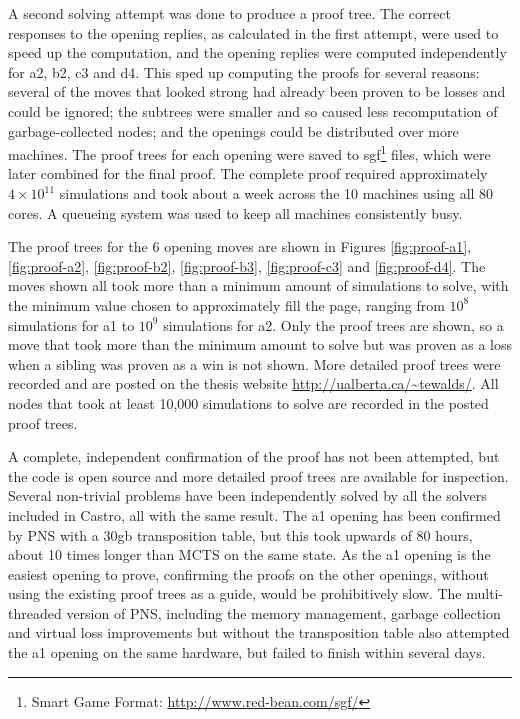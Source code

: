 A second solving attempt was done to produce a proof tree. The correct responses to the opening replies, as calculated in the first attempt, were used to speed up the computation, and the opening replies were computed independently for a2, b2, c3 and d4. This sped up computing the proofs for several reasons: several of the moves that looked strong had already been proven to be losses and could be ignored; the subtrees were smaller and so caused less recomputation of garbage-collected nodes; and the openings could be distributed over more machines. The proof trees for each opening were saved to sgf\footnote{Smart Game Format: \url{http://www.red-bean.com/sgf/}} files, which were later combined for the final proof. The complete proof required approximately $4 \times 10^{11}$ simulations and took about a week across the 10 machines using all 80 cores. A queueing system was used to keep all machines consistently busy.

The proof trees for the 6 opening moves are shown in Figures \ref{fig:proof-a1}, \ref{fig:proof-a2}, \ref{fig:proof-b2}, \ref{fig:proof-b3}, \ref{fig:proof-c3} and \ref{fig:proof-d4}. The moves shown all took more than a minimum amount of simulations to solve, with the minimum value chosen to approximately fill the page, ranging from $10^{8}$ simulations for a1 to $10^{9}$ simulations for a2. Only the proof trees are shown, so a move that took more than the minimum amount to solve but was proven as a loss when a sibling was proven as a win is not shown. More detailed proof trees were recorded and are posted on the thesis website \url{http://ualberta.ca/~tewalds/}. All nodes that took at least 10,000 simulations to solve are recorded in the posted proof trees.

A complete, independent confirmation of the proof has not been attempted, but the code is open source and more detailed proof trees are available for inspection. Several non-trivial problems have been independently solved by all the solvers included in Castro, all with the same result. The a1 opening has been confirmed by PNS with a 30gb transposition table, but this took upwards of 80 hours, about 10 times longer than MCTS on the same state. As the a1 opening is the easiest opening to prove, confirming the proofs on the other openings, without using the existing proof trees as a guide, would be prohibitively slow. The multi-threaded version of PNS, including the memory management, garbage collection and virtual loss improvements but without the transposition table also attempted the a1 opening on the same hardware, but failed to finish within several days.

